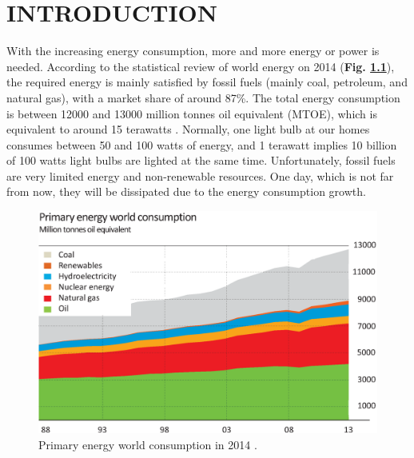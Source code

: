 \documentclass[a4paper, 12pt, titlepage,oneside,drop]{kthesis}
\begin{document}
\tableofcontents



\newpage
{}
\renewcommand{\thesection}{\arabic{chapter}.\arabic{section}}  
\renewcommand{\thetable}{\arabic{chapter}.\arabic{table}}  
\renewcommand{\thefigure}{\arabic{chapter}.\arabic{figure}} 
\renewcommand{\theequation}{\arabic{chapter}.\arabic{equation}} 
\renewcommand{\chaptername}{}



\chapter{INTRODUCTION}

With the increasing energy consumption, more and more energy or power is needed. According to the statistical review of world energy on 2014 \cite{bp} (\textbf{Fig. \ref{wpec}}),
the required energy is mainly satisfied by fossil fuels (mainly coal, petroleum, and natural gas), with a market share of around 87\%. The total energy consumption is between 12000 and 13000 million tonnes oil
equivalent (MTOE), which is equivalent to around 15 terawatts \cite{xie2014creating}. Normally, one light bulb at our homes consumes between 50 and 100 watts of energy, and 1 terawatt implies 10 billion of 100 watts light bulbs are lighted at the
same time. Unfortunately, fossil fuels are very limited energy and non-renewable resources. One day, which is not far from now, they will be dissipated due to the energy consumption growth.

\begin{figure}[H]
\centering
\includegraphics[scale=0.4]{energy.eps}
\caption{Primary energy world consumption in 2014 \cite{bp}.}
\label{wpec}
\end{figure}
\end{document}
